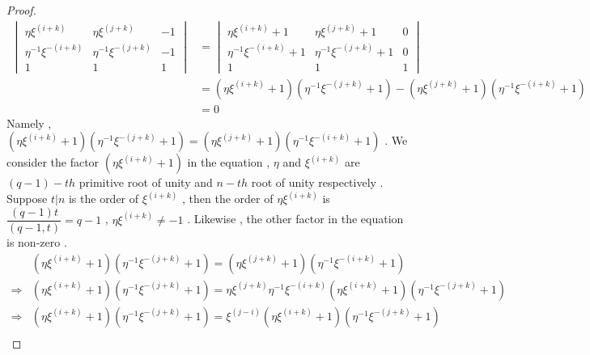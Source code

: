 \documentclass{article}
\begin{document}
\begin{proof}
\begin{align*}
    \begin{vmatrix}
        \eta\xi^{\scriptscriptstyle (i+k)}&\eta\xi^{\scriptscriptstyle (j+k)}&-1\\
        \eta^{\scriptscriptstyle-1}\xi^{\scriptscriptstyle -(i+k)}&\eta^{\scriptscriptstyle-1}\xi^{\scriptscriptstyle -(j+k)}&-1\\
        1&1&1
    \end{vmatrix}&=
    \begin{vmatrix}
        \eta\xi^{\scriptscriptstyle (i+k)}+1&\eta\xi^{\scriptscriptstyle (j+k)}+1&0\\
        \eta^{\scriptscriptstyle-1}\xi^{\scriptscriptstyle -(i+k)}+1&\eta^{\scriptscriptstyle-1}\xi^{\scriptscriptstyle -(j+k)}+1&0\\
        1&1&1
    \end{vmatrix}\\
    &=(\eta\xi^{\scriptscriptstyle (i+k)}+1)(\eta^{\scriptscriptstyle-1}\xi^{\scriptscriptstyle -(j+k)}+1)-
    (\eta\xi^{\scriptscriptstyle (j+k)}+1)(\eta^{\scriptscriptstyle-1}\xi^{\scriptscriptstyle -(i+k)}+1)\\
    &=0
\end{align*}
Namely , $(\eta\xi^{\scriptscriptstyle (i+k)}+1)(\eta^{\scriptscriptstyle-1}\xi^{\scriptscriptstyle -(j+k)}+1)=
    (\eta\xi^{\scriptscriptstyle (j+k)}+1)(\eta^{\scriptscriptstyle-1}\xi^{\scriptscriptstyle -(i+k)}+1)$ . We consider the factor $(\eta\xi^{\scriptscriptstyle (i+k)}+1)$ in the equation , $\eta$ and $\xi^{\scriptscriptstyle (i+k)}$ are $(q-1)-th$ primitive root of unity and $n-th$ root of unity respectively . Suppose $t|n$ is the order of $\xi^{\scriptscriptstyle (i+k)}$ , then the order of $\eta\xi^{\scriptscriptstyle (i+k)}$ is $\dfrac{(q-1)t}{(q-1,t)}=q-1$ , $\eta\xi^{\scriptscriptstyle (i+k)}\neq-1$ . Likewise , the other factor in the equation is non-zero .
\begin{align*}
&(\eta\xi^{\scriptscriptstyle (i+k)}+1)(\eta^{\scriptscriptstyle-1}\xi^{\scriptscriptstyle -(j+k)}+1)=(\eta\xi^{\scriptscriptstyle (j+k)}+1)(\eta^{\scriptscriptstyle-1}\xi^{\scriptscriptstyle -(i+k)}+1)\\
\Rightarrow&(\eta\xi^{\scriptscriptstyle (i+k)}+1)(\eta^{\scriptscriptstyle-1}\xi^{\scriptscriptstyle -(j+k)}+1)=\eta\xi^{\scriptscriptstyle(j+k)}\eta^{\scriptscriptstyle-1}\xi^{\scriptscriptstyle-(i+k)}(\eta\xi^{\scriptscriptstyle (i+k)}+1)(\eta^{\scriptscriptstyle-1}\xi^{\scriptscriptstyle -(j+k)}+1)\\
\Rightarrow&(\eta\xi^{\scriptscriptstyle (i+k)}+1)(\eta^{\scriptscriptstyle-1}\xi^{\scriptscriptstyle -(j+k)}+1)=\xi^{\scriptscriptstyle(j-i)}(\eta\xi^{\scriptscriptstyle (i+k)}+1)(\eta^{\scriptscriptstyle-1}\xi^{\scriptscriptstyle -(j+k)}+1)\\

\end{align*}
\end{proof}
\end{document}
